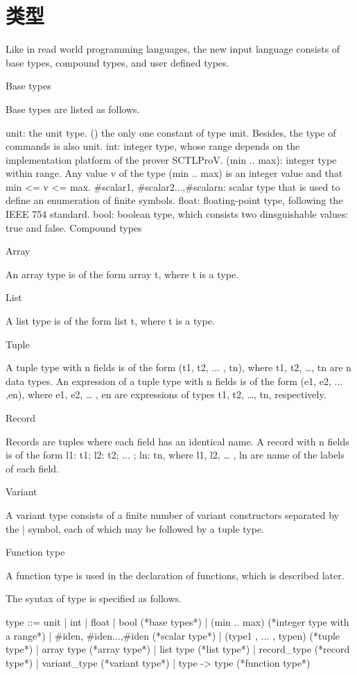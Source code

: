 \section{类型}
Like in read world programming languages, the new input language consists of base types, compound types, and user defined types.

Base types

Base types are listed as follows.

unit: the unit type. () the only one constant of type unit. Besides, the type of commands is also unit.
int: integer type, whose range depends on the implementation platform of the prover SCTLProV.
(min .. max): integer type within range. Any value v of the type (min .. max) is an integer value and that min <= v <= max.
{#scalar1, #scalar2...,#scalarn}: scalar type that is used to define an enumeration of finite symbols.
float: floating-point type, following the IEEE 754 standard.
bool: boolean type, which consists two dinsguishable values: true and false.
Compound types

Array

An array type is of the form array t, where t is a type.

List

A list type is of the form list t, where t is a type.

Tuple

A tuple type with n fields is of the form (t1, t2, ... , tn), where t1, t2, …, tn are n data types. An expression of a tuple type with n fields is of the form (e1, e2, ... ,en), where e1, e2, … , en are expressions of types t1, t2, …, tn, respectively.

Record

Records are tuples where each field has an identical name. A record with n fields is of the form {l1: t1; l2: t2; ... ; ln: tn}, where l1, l2, … , ln are name of the labels of each field.

Variant

A variant type consists of a finite number of variant constructors separated by the | symbol, each of which may be followed by a tuple type.

Function type

A function type is used in the declaration of functions, which is described later.

The syntax of type is specified as follows.

type ::= 
unit | int | float | bool             (*base types*)
| (min .. max)                          (*integer type with a range*)
| {#iden, #iden...,#iden}               (*scalar type*)
| (type1 , ... , typen)                 (*tuple type*)
| array type                            (*array type*)
| list type                             (*list type*)
| record_type                           (*record type*)
| variant_type                          (*variant type*)
| type -> type                          (*function type*)

